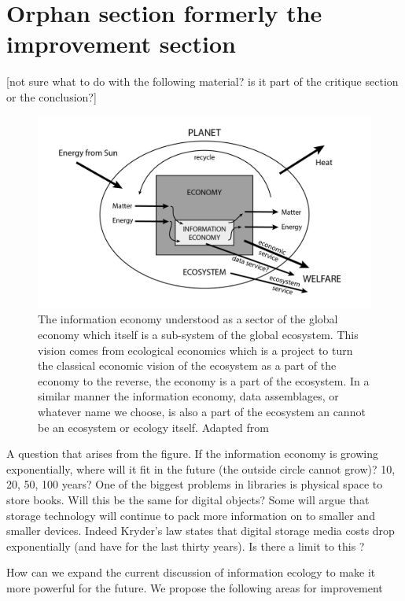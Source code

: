 \section{Orphan section formerly the improvement section}

[not sure what to do with the following material? is it part of the critique section or the conclusion?]

\begin{figure}[!ht]
  \centering
    \includegraphics[width=5.5in]{figures/ecologicalecon}
  \caption{The information economy understood as a sector of the global economy which itself is a sub-system of the global ecosystem. This vision comes from ecological economics which is a project to turn the classical economic vision of the ecosystem as a part of the economy to the reverse, the economy is a part of the ecosystem. In a similar manner the information economy, data assemblages, or whatever name we choose, is also a part of the ecosystem an cannot be an ecosystem or ecology itself. Adapted from \citep[][p. 18]{daly_2004}}
\end{figure}

A question that arises from the figure. If the information economy is growing exponentially, where will it fit in the future (the outside circle cannot grow)? 10, 20, 50, 100 years? One of the biggest problems in libraries is physical space to store books. Will this be the same for digital objects? Some will argue that storage technology will continue to pack more information on to smaller and smaller devices. Indeed Kryder's law states that digital storage media costs drop exponentially (and have for the last thirty years). Is there a limit to this \citep[cf.][]{rosenthal_2012}?
 
How can we expand the current discussion of information ecology to make it more powerful for the future. We propose the following areas for improvement






